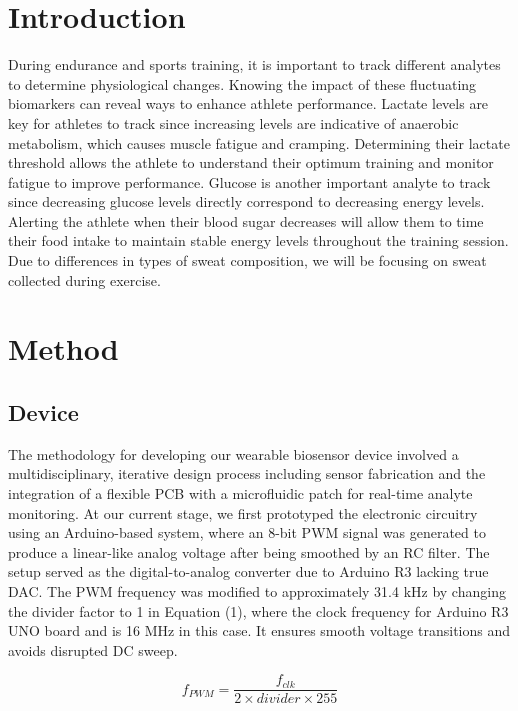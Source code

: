 \documentclass[conference]{IEEEtran}
\begin{document}
\section{Introduction}
During endurance and sports training, it is important to track different analytes to determine physiological changes. Knowing the impact of these fluctuating biomarkers can reveal ways to enhance athlete performance. Lactate levels are key for athletes to track since increasing levels are indicative of anaerobic metabolism, which causes muscle fatigue and cramping. Determining their lactate threshold allows the athlete to understand their optimum training and monitor fatigue to improve performance. Glucose is another important analyte to track since decreasing glucose levels directly correspond to decreasing energy levels. Alerting the athlete when their blood sugar decreases will allow them to time their food intake to maintain stable energy levels throughout the training session. Due to differences in types of sweat composition, we will be focusing on sweat collected during exercise.
\bigskip

\section{Method}

\smallskip

\subsection{Device}
The methodology for developing our wearable biosensor device involved a multidisciplinary, iterative design process including sensor fabrication and the integration of a flexible PCB with a microfluidic patch for real-time analyte monitoring. At our current stage, we first prototyped the electronic circuitry using an Arduino-based system, where an 8-bit PWM signal was generated to produce a linear-like analog voltage after being smoothed by an RC filter. The setup served as the digital-to-analog converter due to Arduino R3 lacking true DAC. The PWM frequency was modified to approximately 31.4 kHz by changing the divider factor to 1 in Equation (1), where the clock frequency for Arduino R3 UNO board and is 16 MHz in this case. It ensures smooth voltage transitions and avoids disrupted DC sweep.

\begin{equation} f_{PWM} = \frac{f_{clk}}{2 \times divider \times 255}\end{equation}
\end{document}
